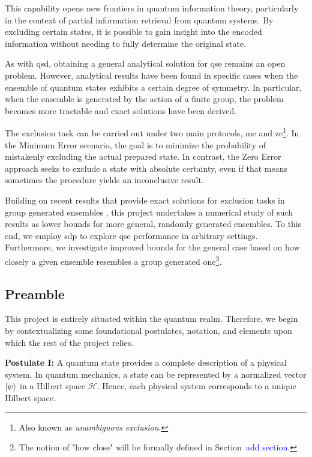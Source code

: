 \documentclass[12pt,letterpaper]{article}
\begin{document}
\begin{multicols}{2}
This capability opens new frontiers in quantum information theory, particularly in the context of partial information retrieval from quantum systems. By excluding certain states, it is possible to gain insight into the encoded information without needing to fully determine the original state.

As with \gls{qsd}, obtaining a general analytical solution for \gls{qse} remains an open problem. However, analytical results have been found in specific cases when the ensemble of quantum states exhibits a certain degree of symmetry. In particular, when the ensemble is generated by the action of a finite group, the problem becomes more tractable and exact solutions have been derived.

The exclusion task can be carried out under two main protocols, \gls{me} and \gls{ze}\footnote{Also known as \emph{unambiguous exclusion}.}. In the Minimum Error scenario, the goal is to minimize the probability of mistakenly excluding the actual prepared state. In contrast, the Zero Error approach seeks to exclude a state with absolute certainty, even if that means sometimes the procedure yields an inconclusive result.

Building on recent results that provide exact solutions for exclusion tasks in group generated ensembles \cite{MainPaper}, this project undertakes a numerical study of such results as lower bounds for more general, randomly generated ensembles. To this end, we employ \gls{sdp} to explore \gls{qse} performance in arbitrary settings. Furthermore, we investigate improved bounds for the general case based on how closely a given ensemble resembles a group generated one\footnote{The notion of "how close" will be formally defined in Section~\textcolor{blue}{add section}.}.

\subsection{Preamble}

This project is entirely situated within the quantum realm. Therefore, we begin by contextualizing some foundational postulates, notation, and elements upon which the rest of the project relies.

\textbf{Postulate I:} A quantum state provides a complete description of a physical system. In quantum mechanics, a state can be represented by a normalized vector $\ket{\psi}$ in a Hilbert space $\mathcal{H}$. Hence, each physical system corresponds to a unique Hilbert space.


\end{multicols}
\end{document}
